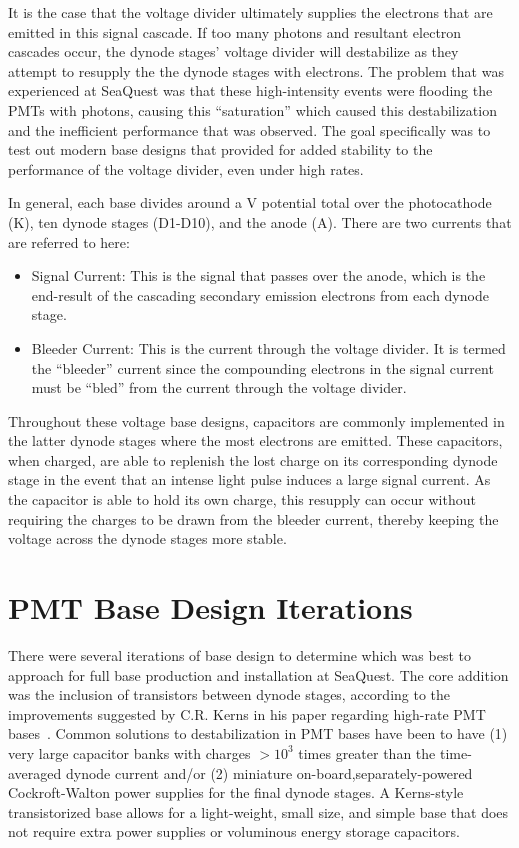It is the case that the voltage divider ultimately supplies the electrons that are emitted in this signal cascade. If too many photons and resultant electron cascades occur, the dynode stages' voltage divider will destabilize as they attempt to resupply the the dynode stages with electrons. The problem that was experienced at SeaQuest was that these high-intensity events were flooding the PMTs with photons, causing this ``saturation'' which caused this destabilization and the inefficient performance that was observed. The goal specifically was to test out modern base designs that provided for added stability to the performance of the voltage divider, even under high rates.

In general, each base divides around a \unit[-1500]{V} potential total over the photocathode (K), ten dynode stages (D1-D10), and the anode (A). There are two currents that are referred to here:
\begin{itemize}
	\item Signal Current: This is the signal that passes over the anode, which is the end-result of the cascading secondary emission electrons from each dynode stage.
	\item Bleeder Current: This is the current through the voltage divider. It is termed the ``bleeder'' current since the compounding electrons in the signal current must be ``bled'' from the current through the voltage divider.
\end{itemize}

Throughout these voltage base designs, capacitors are commonly implemented in the latter dynode stages where the most electrons are emitted. These capacitors, when charged, are able to replenish the lost charge on its corresponding dynode stage in the event that an intense light pulse induces a large signal current.  As the capacitor is able to hold its own charge, this resupply can occur without requiring the charges to be drawn from the bleeder current, thereby keeping the voltage across the dynode stages more stable.

\section{PMT Base Design Iterations}

There were several iterations of base design to determine which was best to approach for full base production and installation at SeaQuest. The core addition was the inclusion of transistors between dynode stages, according to the improvements suggested by C.R. Kerns in his paper regarding high-rate PMT bases~\cite{Kerns:1977qr}. Common solutions to destabilization in PMT bases have been to have (1) very large capacitor banks with charges $> 10^3$ times greater than the time-averaged dynode current and/or (2) miniature on-board,separately-powered Cockroft-Walton power supplies for the final dynode stages. A Kerns-style transistorized base allows for a light-weight, small size, and simple base that does not require extra power supplies or voluminous energy storage capacitors.

